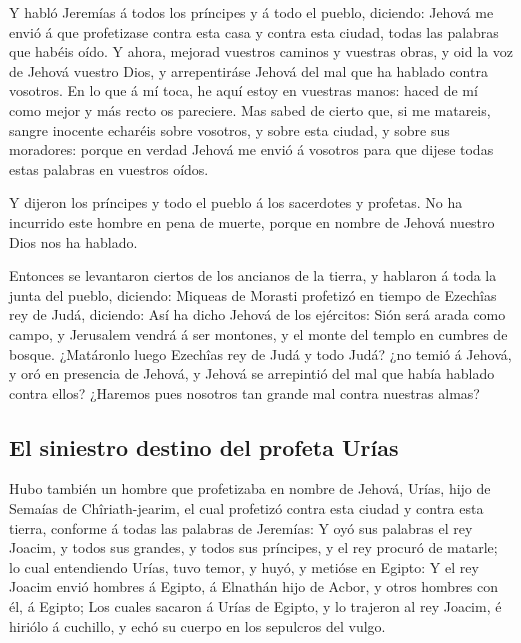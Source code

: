  Y habló Jeremías á todos los príncipes y á todo el pueblo,
diciendo: Jehová me envió á que profetizase contra esta casa y contra
esta ciudad, todas las palabras que habéis oído.  Y ahora,
mejorad vuestros caminos y vuestras obras, y oid la voz de Jehová
vuestro Dios, y arrepentiráse Jehová del mal que ha hablado contra
vosotros.  En lo que á mí toca, he aquí estoy en vuestras
manos: haced de mí como mejor y más recto os pareciere. 
Mas sabed de cierto que, si me matareis, sangre inocente echaréis sobre
vosotros, y sobre esta ciudad, y sobre sus moradores: porque en verdad
Jehová me envió á vosotros para que dijese todas estas palabras en
vuestros oídos.

 Y dijeron los príncipes y todo el pueblo á los sacerdotes
y profetas. No ha incurrido este hombre en pena de muerte, porque en
nombre de Jehová nuestro Dios nos ha hablado.

 Entonces se levantaron ciertos de los ancianos de la
tierra, y hablaron á toda la junta del pueblo, diciendo: 
Miqueas de Morasti profetizó en tiempo de Ezechîas rey de Judá,
diciendo: Así ha dicho Jehová de los ejércitos: Sión será arada como
campo, y Jerusalem vendrá á ser montones, y el monte del templo en
cumbres de bosque.  ¿Matáronlo luego Ezechîas rey de Judá y
todo Judá? ¿no temió á Jehová, y oró en presencia de Jehová, y Jehová se
arrepintió del mal que había hablado contra ellos? ¿Haremos pues
nosotros tan grande mal contra nuestras almas?

\hypertarget{el-siniestro-destino-del-profeta-uruxedas}{%
\subsection{El siniestro destino del profeta
Urías}\label{el-siniestro-destino-del-profeta-uruxedas}}

 Hubo también un hombre que profetizaba en nombre de
Jehová, Urías, hijo de Semaías de Chîriath-jearim, el cual profetizó
contra esta ciudad y contra esta tierra, conforme á todas las palabras
de Jeremías:  Y oyó sus palabras el rey Joacim, y todos sus
grandes, y todos sus príncipes, y el rey procuró de matarle; lo cual
entendiendo Urías, tuvo temor, y huyó, y metióse en Egipto:
 Y el rey Joacim envió hombres á Egipto, á Elnathán hijo de
Acbor, y otros hombres con él, á Egipto;  Los cuales
sacaron á Urías de Egipto, y lo trajeron al rey Joacim, é hiriólo á
cuchillo, y echó su cuerpo en los sepulcros del vulgo.

